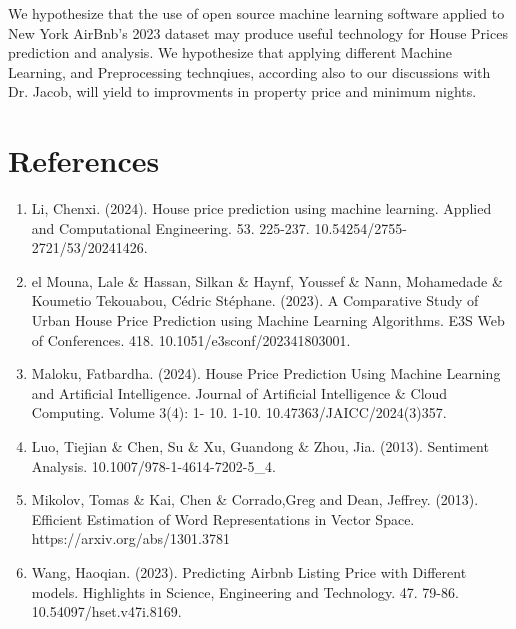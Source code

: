 \documentclass[a4paper,12pt]{article}
\begin{document}
We hypothesize that the use of open source machine learning software applied to New York AirBnb's 2023 dataset may produce useful technology for House Prices prediction and analysis. We hypothesize that applying different Machine Learning, and Preprocessing technqiues, according also to our discussions with Dr. Jacob, will yield to improvments in property price and minimum nights.


\newpage
\section*{References}
\begin{enumerate}
  \item Li, Chenxi. (2024). House price prediction using machine learning. Applied and Computational Engineering. 53. 225-237. 10.54254/2755-2721/53/20241426.
  \item el Mouna, Lale \& Hassan, Silkan \& Haynf, Youssef \& Nann, Mohamedade \& Koumetio Tekouabou, Cédric Stéphane. (2023). A Comparative Study of Urban House Price Prediction using Machine Learning Algorithms. E3S Web of Conferences. 418. 10.1051/e3sconf/202341803001. 
  \item Maloku, Fatbardha. (2024). House Price Prediction Using Machine Learning and Artificial Intelligence. Journal of Artificial Intelligence \& Cloud Computing. Volume 3(4): 1- 10. 1-10. 10.47363/JAICC/2024(3)357. 
  \item Luo, Tiejian \& Chen, Su \& Xu, Guandong \& Zhou, Jia. (2013). Sentiment Analysis. 10.1007/978-1-4614-7202-5\_4. 
  \item Mikolov, Tomas \& Kai, Chen \& Corrado,Greg and Dean, Jeffrey. (2013). Efficient Estimation of Word Representations in Vector Space. https://arxiv.org/abs/1301.3781
  \item Wang, Haoqian. (2023). Predicting Airbnb Listing Price with Different models. Highlights in Science, Engineering and Technology. 47. 79-86. 10.54097/hset.v47i.8169.
\end{enumerate}
\end{document}
